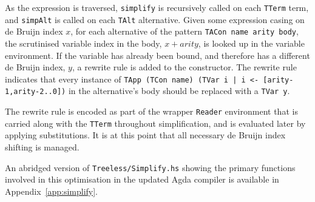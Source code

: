 As the expression is traversed, \lstinline{simplify} is recursively called on each \lstinline{TTerm} term, and \lstinline{simpAlt} is called on each \lstinline{TAlt} alternative. Given some expression casing on de Bruijn index $x$, for each alternative of the pattern \lstinline{TACon name arity body}, the scrutinised variable index in the body, $x + arity$, is looked up in the variable environment. If the variable has already been bound, and therefore has a different de Bruijn index, $y$, a rewrite rule is added to the constructor. The rewrite rule indicates that every instance of \lstinline{TApp (TCon name) (TVar i | i <- [arity-1,arity-2..0])} in the alternative's body should be replaced with a \lstinline{TVar y}.

The rewrite rule is encoded as part of the wrapper \lstinline{Reader} environment that is carried along with the \lstinline{TTerm} throughout simplification, and is evaluated later by applying substitutions. It is at this point that all necessary de Bruijn index shifting is managed.

An abridged version of \texttt{Treeless/Simplify.hs} showing the primary functions involved in this optimisation in the updated Agda compiler is available in Appendix~\ref{app:simplify}.
